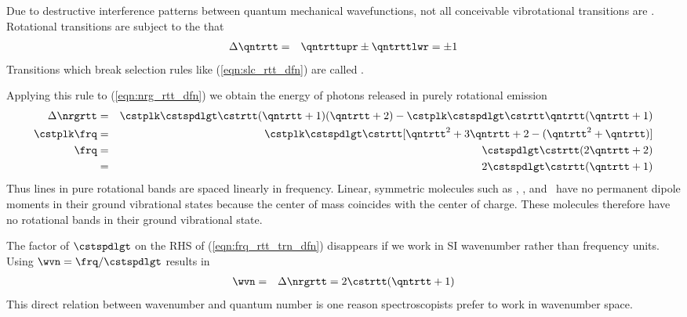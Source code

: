 \documentclass[12pt]{article}
\begin{document}
Due to destructive interference patterns between quantum mechanical
wavefunctions, not all conceivable vibrotational transitions are 
.
Rotational transitions are subject to the 
that 
\begin{eqnarray}
\Delta \qntrtt & = & \qntrttupr \pm \qntrttlwr = \pm 1
\label{eqn:slc_rtt_dfn}
\end{eqnarray}
Transitions which break selection rules like (\ref{eqn:slc_rtt_dfn})
are called .

Applying this rule to (\ref{eqn:nrg_rtt_dfn}) we obtain the energy of
photons released in purely rotational emission
\begin{eqnarray}
\Delta \nrgrtt 
& = & 
\cstplk \cstspdlgt \cstrtt (\qntrtt + 1) (\qntrtt + 2)
- \cstplk \cstspdlgt \cstrtt \qntrtt (\qntrtt + 1) \nonumber \\
\cstplk \frq
& = & \cstplk \cstspdlgt \cstrtt [ \qntrtt^{2} + 3\qntrtt + 2
- ( \qntrtt^{2} + \qntrtt ) ] \nonumber \\
\frq
& = & \cstspdlgt \cstrtt ( 2 \qntrtt + 2 ) \nonumber \\
& = & 2 \cstspdlgt \cstrtt ( \qntrtt + 1 )
\label{eqn:frq_rtt_trn_dfn}
\end{eqnarray}
Thus lines in pure rotational bands are spaced linearly in frequency. 
Linear, symmetric molecules such as \Nd, \Od, and \COd\ have no
permanent dipole moments in their ground vibrational states because
the center of mass coincides with the center of charge.
These molecules therefore have no rotational bands in their ground
vibrational state.

The factor of $\cstspdlgt$ on the RHS of (\ref{eqn:frq_rtt_trn_dfn}) 
disappears if we work in SI wavenumber rather than frequency units.
Using $\wvn = \frq / \cstspdlgt$ results in 
\begin{eqnarray}
\wvn & = & \Delta \nrgrtt = 2 \cstrtt ( \qntrtt + 1 )
\label{eqn:wvn_rtt_trn_dfn}
\end{eqnarray}
This direct relation between wavenumber and quantum number is one
reason spectroscopists prefer to work in wavenumber space.
\end{document}
